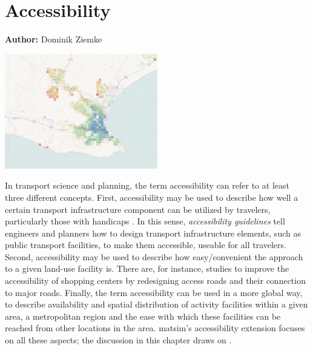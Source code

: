 \chapter{Accessibility}
\label{ch:accessibility}

\hfill \textbf{Author:} Dominik Ziemke

\begin{center} \includegraphics[width=0.5\textwidth, angle=0]{extending/figures/accessibility/w_freeSpeed_snapshot.png} \end{center}



In transport science and planning, the term accessibility can refer to at least three different concepts. 
First, accessibility may be used to describe how well a certain transport infrastructure component 
can be utilized by travelers, particularly those with handicaps \citep{Faura2012AccessibilityEvaluationTrafficSimulation}. 
In this sense, \emph{accessibility guidelines} tell engineers and planners how to design transport 
infrastructure elements, such as public transport facilities, to make them accessible, \ie useable 
for all travelers. Second, accessibility may be used to describe how easy/convenient the approach 
to a given land-use facility is. There are, for instance, studies \citep{Fujiyama2004AccessibleDesignPTFacilities} 
to improve the accessibility of shopping centers by redesigning access roads and their 
connection to major roads. Finally, the term accessibility can be used in a more global way, to 
describe availability and spatial distribution of activity facilities within a given area, \eg a 
metropolitan region and the ease with which these facilities can be reached from other locations in
the area. \gls{matsim}'s accessibility extension focuses on all these aspects; 
the discussion in this chapter draws on \citet{NicolaiNagelHiResAccessibilityMethod}.

